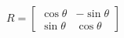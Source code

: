 \documentclass[preview]{standalone}
\begin{document}
\begin{align*}
R = \begin{bmatrix} \cos\theta & -\sin\theta \\ \sin\theta & \cos\theta \end{bmatrix}
\end{align*}
\end{document}
